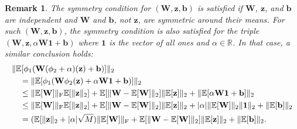 \documentclass[twoside]{article}
\renewcommand{\ss}[1]{_{\text{#1}}}
\newcommand{\vb}{\mathbf{b}}
\newcommand{\vz}{\mathbf{z}}
\newcommand{\vone}{\mathbf{1}}
\newcommand{\mW}{\mathbf{W}}
\newcommand{\E}{\mathbb{E}}
\newcommand{\R}{\mathbb{R}}
\renewcommand{\ss}[1]{_{\text{#1}}}        %
\DeclarePairedDelimiter\norm{\|}{\|}             %
\DeclarePairedDelimiter\abs{|}{|}                %
\theoremstyle{theoremstyle}
\newtheorem{remark}[theorem]{Remark}
\begin{document}
\begin{remark} \label{rem:symmetry_offset}
    The symmetry condition for $(\mW, \vz, \vb)$ is satisfied if $\mW$, $\vz$, and $\vb$ are independent and $\mW$ and $\vb$, not $\vz$, are symmetric around their means.
    For such $(\mW, \vz, \vb)$, the symmetry condition is also satisfied for the triple $(\mW, \vz, \alpha \mW \vone + \vb)$
    where $\vone$ is the vector of all ones and $\alpha \in \R$.
    In that case, a similar conclusion holds:
    \begin{align}
        &\norm{\E[\phi_1(\mW (\phi_2 + \alpha)(\vz) + \vb)]}_2 \\
        &\quad= \norm{\E[\phi_1(\mW \phi_2(\vz) + \alpha \mW\vone + \vb)]}_2 \\
        &\quad\le  \norm{\E[\mW]}\ss{F}\E[\norm{\vz}_2] + \E[\norm{\mW - \E[\mW]}_2] \norm{\E[\vz]}_2 + \norm{\E[\alpha \mW\vone + \vb]}_2 \\
        &\quad\le \norm{\E[\mW]}\ss{F}\E[\norm{\vz}_2] + \E[\norm{\mW - \E[\mW]}_2] \norm{\E[\vz]}_2 + \abs{\alpha} \norm{\E[\mW]}_2 \norm{\vone}_2 + \norm{\E[\vb]}_2 \\
        &\quad= (\E[\norm{\vz}_2 + \abs{\alpha}\sqrt{M})\norm{\E[\mW]}\ss{F} + \E[\norm{\mW - \E[\mW]}_2] \norm{\E[\vz]}_2 + \norm{\E[\vb]}_2.
    \end{align}
\end{remark}
\end{document}
